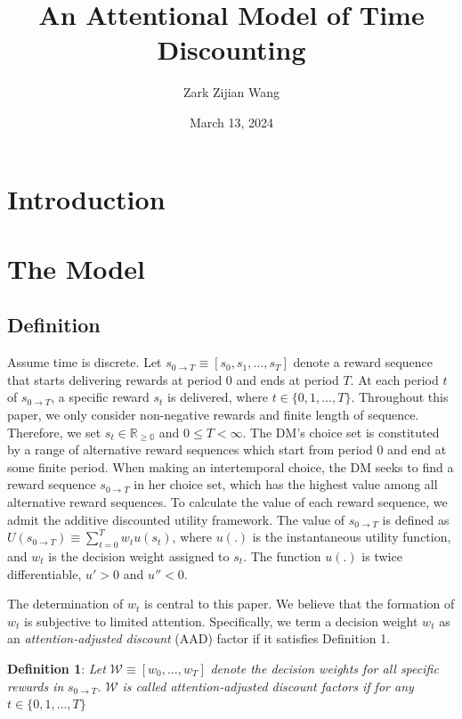 \documentclass[
  12pt,
]{article}
\title{An Attentional Model of Time Discounting}
\author{Zark Zijian Wang}
\date{March 13, 2024}
\begin{document}
\maketitle

\hypertarget{introduction}{%
\section{Introduction}\label{introduction}}

\hypertarget{the-model}{%
\section{The Model}\label{the-model}}

\hypertarget{definition}{%
\subsection{Definition}\label{definition}}

Assume time is discrete. Let
\(s_{0\rightarrow T}\equiv[s_0,s_1,...,s_T]\) denote a reward sequence
that starts delivering rewards at period 0 and ends at period \(T\). At
each period \(t\) of \(s_{0\rightarrow T}\), a specific reward \(s_t\)
is delivered, where \(t\in\{0,1,…,T\}\). Throughout this paper, we only
consider non-negative rewards and finite length of sequence. Therefore,
we set \(s_t \in \mathbb{R_{\geq 0}}\) and \(0\leq T<\infty\). The DM's
choice set is constituted by a range of alternative reward sequences
which start from period 0 and end at some finite period. When making an
intertemporal choice, the DM seeks to find a reward sequence
\(s_{0\rightarrow T}\) in her choice set, which has the highest value
among all alternative reward sequences. To calculate the value of each
reward sequence, we admit the additive discounted utility framework. The
value of \(s_{0\rightarrow T}\) is defined as
\(U(s_{0\rightarrow T})\equiv \sum_{t=0}^T w_{t}u(s_t)\), where \(u(.)\)
is the instantaneous utility function, and \(w_t\) is the decision
weight assigned to \(s_t\). The function \(u(.)\) is twice
differentiable, \(u'>0\) and \(u''<0\).

The determination of \(w_t\) is central to this paper. We believe that
the formation of \(w_t\) is subjective to limited attention.
Specifically, we term a decision weight \(w_t\) as an
\emph{attention-adjusted discount} (AAD) factor if it satisfies
Definition 1.

\textbf{Definition 1}: \emph{Let} \(\mathcal{W}\equiv[w_0,...,w_T]\)
\emph{denote the decision weights for all specific rewards in}
\(s_{0\rightarrow T}\)\emph{.} \(\mathcal{W}\) \emph{is called
attention-adjusted discount factors if for any} \(t\in\{0,1,…,T\}\)
\end{document}
